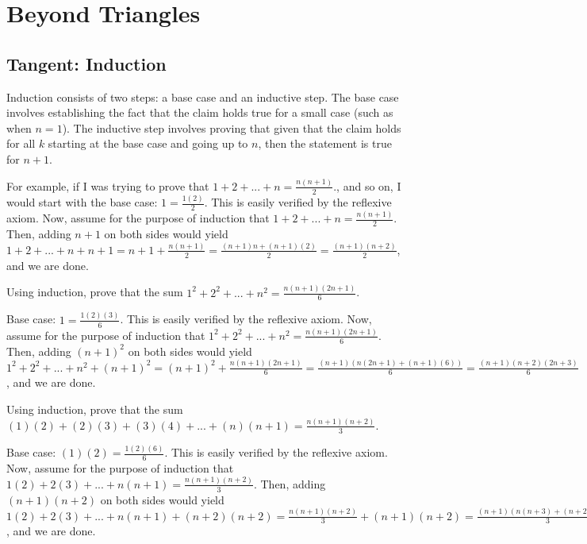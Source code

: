 \documentclass[11pt]{article}
\begin{document}
\section{Beyond Triangles}

\subsection{Tangent: Induction}

Induction consists of two steps: a base case and an inductive step. The base case involves establishing the fact that the claim holds true for a small case (such as when $n=1$). The inductive step involves proving that given that the claim holds for all $k$ starting at the base case and going up to $n$, then the statement is true for $n+1$.

For example, if I was trying to prove that $1+2+...+n = \frac{n(n+1)}{2}$., and so on, I would start with the base case: $1=\frac{1(2)}{2}$. This is easily verified by the reflexive axiom. Now, assume for the purpose of induction that $1+2+...+n = \frac{n(n+1)}{2}$. Then, adding $n+1$ on both sides would yield $1+2+...+n+n+1=n+1+\frac{n(n+1)}{2} = \frac{(n+1)n + (n+1)(2)}{2} = \frac{(n+1)(n+2)}{2}$, and we are done.

\begin{problem}
Using induction, prove that the sum $1^2+2^2+...+n^2 = \frac{n(n+1)(2n+1)}{6}$.
\end{problem}

\begin{solution}
Base case: $1=\frac{1(2)(3)}{6}$. This is easily verified by the reflexive axiom. Now, assume for the purpose of induction that $1^2+2^2+...+n^2 = \frac{n(n+1)(2n+1)}{6}$. Then, adding $(n+1)^2$ on both sides would yield $1^2+2^2+...+n^2+(n+1)^2=(n+1)^2+\frac{n(n+1)(2n+1)}{6} = \frac{(n+1)(n(2n+1) + (n+1)(6))}{6} = \frac{(n+1)(n+2)(2n+3)}{6}$, and we are done.

\end{solution}

\begin{problem}
Using induction, prove that the sum $(1)(2) + (2)(3) + (3)(4) + ... + (n)(n+1) = \frac{n(n+1)(n+2)}{3}$.
\end{problem}

\begin{solution}
Base case: $(1)(2)=\frac{1(2)(6)}{6}$. This is easily verified by the reflexive axiom. Now, assume for the purpose of induction that $1(2)+2(3)+...+n(n+1) = \frac{n(n+1)(n+2)}{3}$. Then, adding $(n+1)(n+2)$ on both sides would yield $1(2)+2(3)+...+n(n+1)+(n+2)(n+2) = \frac{n(n+1)(n+2)}{3} + (n+1)(n+2) = \frac{(n+1)(n(n+3) + (n+2)(3))}{3} = \frac{(n+1)(n+2)(n+3)}{3}$, and we are done.
\end{solution}
\end{document}
